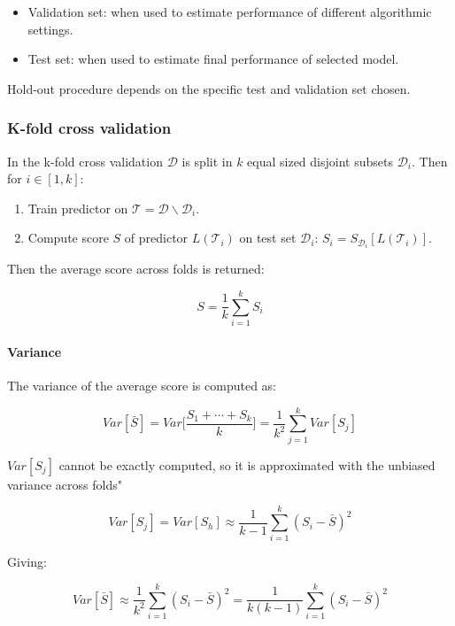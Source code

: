 		\begin{multicols}{2}
			\begin{itemize}
				\item Validation set: when used to estimate performance of different algorithmic settings.
				\item Test set: when used to estimate final performance of selected model.
			\end{itemize}
		\end{multicols}

		Hold-out procedure depends on the specific test and validation set chosen.

		\subsubsection{K-fold cross validation}
		In the k-fold cross validation $\mathcal{D}$ is split in $k$ equal sized disjoint subsets $\mathcal{D}_i$.
		Then for $i\in[1,k]$:

		\begin{multicols}{2}
			\begin{enumerate}
				\item Train predictor on $\mathcal{T} = \mathcal{D}\backslash\mathcal{D}_i$.
				\item Compute score $S$ of predictor $L(\mathcal{T}_i)$ on test set $\mathcal{D}_i$: $S_i = S_{\mathcal{D}_i}[L(\mathcal{T}_i)]$.
			\end{enumerate}
		\end{multicols}

		Then the average score across folds is returned:

		$$S = \frac{1}{k}\sum\limits_{i=1}^k S_i$$

			\paragraph{Variance}
			The variance of the average score is computed as:

			$$Var[\bar{S}] = Var\biggl[\frac{S_1+\cdots + S_k}{k}\biggr] = \frac{1}{k^2}\sum\limits_{j=1}^k Var[S_j]$$

			$Var[S_j]$ cannot be exactly computed, so it is approximated with the unbiased variance across folds"

			$$Var[S_j] = Var[S_h]\approx \frac{1}{k-1} \sum\limits_{i=1}^k(S_i-\bar{S})^2$$

			Giving:

			$$Var[\bar{S}] \approx \frac{1}{k^2}\sum\limits_{i=1}^k(S_i-\bar{S})^2 = \frac{1}{k(k-1)}\sum\limits_{i=1}^k(S_i - \bar{S})^2$$

